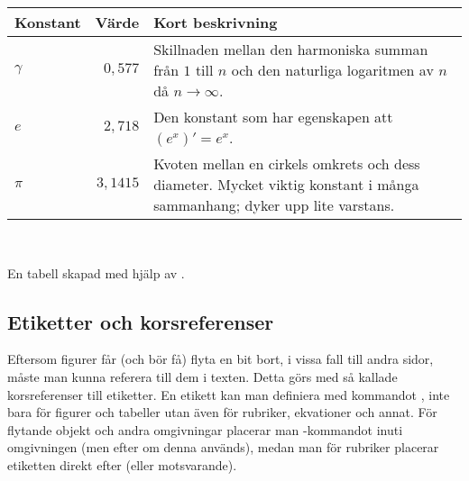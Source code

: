 \documentclass[10pt,../../a4.tex]{subfiles}
\begin{document}
\begin{kod}[p]
	\centering 
	\begin{minipage}{0.9\textwidth} %
		\begin{latexcode}
\begin{tabular}{l r p{4cm}}
\toprule 
Konstant & Värde & Kort beskrivning \\
\midrule 
\(\gamma\) & \(0,577\) & Skillnaden mellan den
 harmoniska summan från \(1\) till \(n\) och den
 naturliga logaritmen av \(n\) då \(n\to\infty\).\\
\(e\) & \(2,718\) & Den konstant som har
egenskapen att \((e^x)' = e^x\). \\
\(\pi\) & \(3,1415\) & Kvoten mellan en cirkels
 omkrets och dess diameter. Mycket viktig
 konstant i många sammanhang; dyker upp
 lite varstans. \\
\bottomrule
\end{tabular}
		\end{latexcode}
	\end{minipage}
	\\ \medskip
	\caption{En tabell skapad med hjälp av .}
	\label{ex:tabular}
\end{kod}

\subsection{Etiketter och korsreferenser}\label{sec:labels}
Eftersom figurer får (och bör få) flyta en bit bort, i vissa fall till 
andra sidor, måste man kunna referera till dem i texten. Detta görs med så
kallade korsreferenser till etiketter. En etikett kan man definiera med
kommandot , inte bara för figurer och tabeller utan även för
rubriker, ekvationer och annat. För flytande objekt och andra omgivningar
placerar man -kommandot inuti omgivningen (men efter 
 om denna används), medan man för rubriker placerar etiketten
direkt efter  (eller motsvarande).
\end{document}
